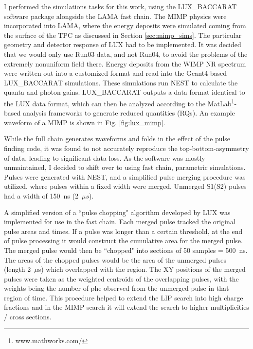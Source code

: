 I performed the simulations tasks for this work, using the LUX\_BACCARAT software package alongside the LAMA fast chain.
The MIMP physics were incorporated into LAMA, where the energy deposits were simulated coming from the surface of the TPC as discussed in Section \ref{sec:mimp_sims}.
The particular geometry and detector response of LUX had to be implemented.
It was decided that we would only use Run03 data, and not Run04, to avoid the problems of the extremely nonuniform field there\cite{lux_collaboration_3d_2017}.
Energy deposits from the WIMP NR spectrum were written out into a customized format and read into the Geant4-based LUX\_BACCARAT simulations.
These simulations run NEST\cite{szydagis_nest_2011} to calculate the quanta and photon gains.
LUX\_BACCARAT  outputs a data format identical to the LUX data format, which can then be analyzed according to the MatLab\footnote{www.mathworks.com/}-based analysis frameworks to generate reduced quantities (RQs).
An example waveform of a MIMP is shown in Fig. \ref{fig:lux_mimp}.

While the full chain generates waveforms and folds in the effect of the pulse finding code, it was found to not accurately reproduce the top-bottom-asymmetry of data, leading to significant data loss.
As the software was mostly unmaintained, I decided to shift over to using fast chain, parametric simulations.
Pulses were generated with NEST, and a simplified pulse merging procedure was utilized, where pulses within a fixed width were merged.
Unmerged S1(S2) pulses had a width of 150~ns (2~$\mu s$).

A simplified version of a ``pulse chopping" algorithm developed by LUX \cite{terman_paul_search_nodate} was implemented for use in the fast chain.
Each merged pulse tracked the original pulse areas and times.
If a pulse was longer than a certain threshold, at the end of pulse processing it would construct the cumulative area for the merged pulse.
The merged pulse would then be ``chopped" into sections of 50 samples = 500~ns.
The areas of the chopped pulses would be the area of the unmerged pulses (length 2~$\mu$s) which overlapped with the region.
The XY positions of the merged pulses were taken as the weighted centroids of the overlapping pulses, with the weights being the number of phe observed from the unmerged pulse in that region of time.
This procedure helped to extend the LIP search into high charge fractions and in the MIMP search it will extend the search to higher multiplicities / cross sections.

